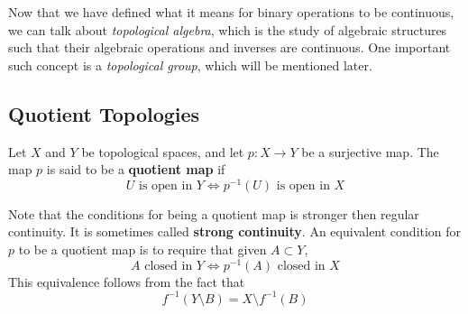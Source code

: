   Now that we have defined what it means for binary operations to be continuous, we can talk about \textit{topological algebra}, which is the study of algebraic structures such that their algebraic operations and inverses are continuous. One important such concept is a \textit{topological group}, which will be mentioned later. 

\subsection{Quotient Topologies}

  \begin{definition}
    Let $X$ and $Y$ be topological spaces, and let $p: X \rightarrow Y$ be a surjective map. The map $p$ is said to be a \textbf{quotient map} if
    \begin{equation}
      U \text{ is open in } Y \iff p^{-1}(U) \text{ is open in } X
    \end{equation}
  \end{definition}

  Note that the conditions for being a quotient map is stronger then regular continuity. It is sometimes called \textbf{strong continuity}. An equivalent condition for $p$ to be a quotient map is to require that given $A \subset Y$, 
  \begin{equation}
    A \text{ closed in } Y \iff p^{-1}(A) \text{ closed in } X
  \end{equation}
  This equivalence follows from the fact that
  \begin{equation}
    f^{-1}(Y \setminus B) = X \setminus f^{-1}(B)
  \end{equation}

